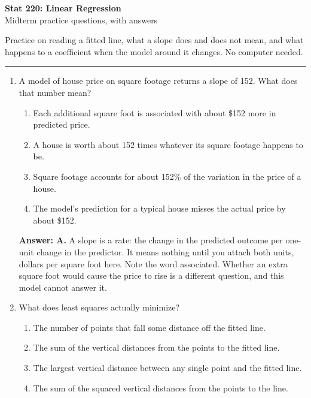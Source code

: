 \documentclass[11pt]{article}
\begin{document}
\begin{center}
{\Large\textbf{Stat 220: Linear Regression}}\\[3pt]
{\large Midterm practice questions, with answers}\\[6pt]
\end{center}

Practice on reading a fitted line, what a slope does and does not mean, and what happens to a
coefficient when the model around it changes. No computer needed.

\vspace{8pt}
\hrule
\vspace{10pt}

\begin{enumerate}[itemsep=14pt]
\item A model of house price on square footage returns a slope of 152. What does that number mean?

\begin{enumerate}[label=\Alph*., itemsep=1pt, topsep=3pt]
  \item Each additional square foot is associated with about \$152 more in predicted price.
  \item A house is worth about 152 times whatever its square footage happens to be.
  \item Square footage accounts for about 152\% of the variation in the price of a house.
  \item The model's prediction for a typical house misses the actual price by about \$152.
\end{enumerate}

\vspace{2pt}
\textbf{Answer: A.} A slope is a rate: the change in the predicted outcome per one-unit change in the predictor. It means nothing until you attach both units, dollars per square foot here. Note the word associated. Whether an extra square foot would cause the price to rise is a different question, and this model cannot answer it.
\vspace{4pt}

\item What does least squares actually minimize?

\begin{enumerate}[label=\Alph*., itemsep=1pt, topsep=3pt]
  \item The number of points that fall some distance off the fitted line.
  \item The sum of the vertical distances from the points to the fitted line.
  \item The largest vertical distance between any single point and the fitted line.
  \item The sum of the squared vertical distances from the points to the line.
\end{enumerate}


\end{enumerate}
\end{document}
